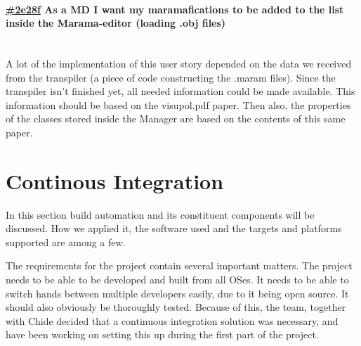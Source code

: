 \documentclass[10pt]{extarticle} %
\newcommand{\myparagraph}[1]{\paragraph{#1}\mbox{}\\} %
\begin{document}
    \newcommand{\clickup}[1]{https://app.clickup.com/757520/761304/t/#1}

    \myparagraph{\href{\clickup{2e28f}}{\#2e28f} As a MD I want my maramafications to be added to the list inside the Marama-editor (loading .obj files)}
    A lot of the implementation of this user story depended on the data we received from the transpiler (a piece of code constructing the .maram files).
    Since the transpiler isn't finished yet, all needed information could be made available.
    This information should be based on the visupol.pdf\cite{visupol} paper.
Then also, the properties of the classes stored inside the Manager are based on the contents of this same paper.

    \newpage
    \section{Continous Integration}
    In this section build automation and its constituent components will be discussed.
    How we applied it, the software used and the targets and platforms supported are among a few.

    The requirements for the project contain several important matters.
    The project needs to be able to be developed and built from all OSes.
    It needs to be able to switch hands between multiple developers easily, due to it being open source.
    It should also obviously be thoroughly tested.
    Because of this, the team, together with Chide decided that a continuous integration solution was necessary, and have been working on setting this up during the first part of the project.
\end{document}
